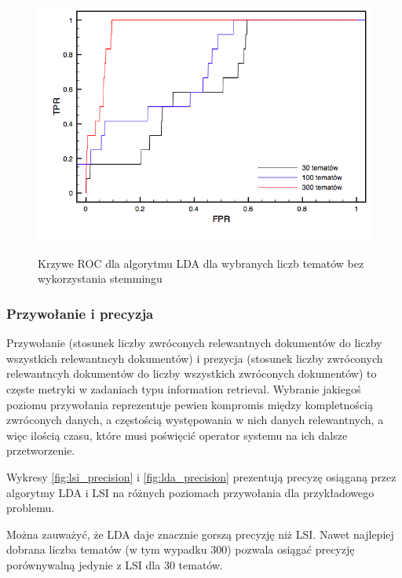 \documentclass[11pt,a4paper]{article}
\begin{document}
\begin{figure}[h]
\caption{Krzywe ROC dla algorytmu LDA dla wybranych liczb tematów bez wykorzystania stemmingu}
\includegraphics[width=\linewidth]{gfx/lda_roc_untagged.png}
\label{roc_lda_untagged}
\end{figure}

\FloatBarrier

\subsubsection{Przywołanie i precyzja}

Przywołanie (stosunek liczby zwróconych relewantnych dokumentów do liczby
wszystkich relewantncyh dokumentów) i prezycja (stosunek liczby zwróconych
relewantncyh dokumentów do liczby wszystkich zwróconych dokumentów) to częste
metryki w zadaniach typu information retrieval. Wybranie jakiegoś poziomu
przywołania reprezentuje pewien kompromis między kompletnością zwróconych
danych, a częstością występowania w nich danych relewantnych, a więc ilością
czasu, które musi poświęcić operator systemu na ich dalsze przetworzenie.

Wykresy \ref{fig:lsi_precision} i \ref{fig:lda_precision} prezentują precyzę
osiąganą przez algorytmy LDA i LSI na różnych poziomach przywołania dla
przykładowego problemu.

Można zauważyć, że LDA daje znacznie gorszą precyzję niż LSI. Nawet najlepiej
dobrana liczba tematów (w tym wypadku 300) pozwala osiągać precyzję
porównywalną jedynie z LSI dla 30 tematów.
\end{document}
